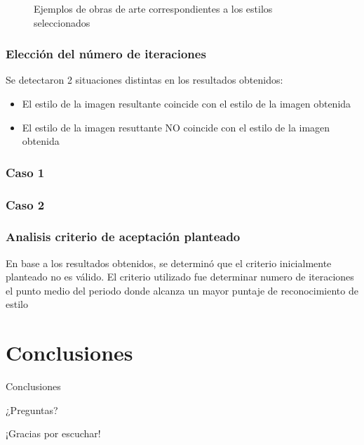 \documentclass[12pt,center]{beamer}
\begin{document}
\begin{frame}
\begin{figure}
\begin{center}
\begin{tabularx}{\textwidth}{@{}cXX@{}}
      \end{tabularx}

      \caption{Ejemplos de obras de arte correspondientes a los estilos seleccionados}\label{mosaico_estilos}
      \end{center}

    \end{figure}
\end{frame}

\begin{frame}
  \frametitle{Elección del número de iteraciones}
  Se detectaron 2 situaciones distintas en los resultados obtenidos:
  \begin{itemize}
    \item El estilo de la imagen resultante coincide con el estilo de la imagen obtenida
    \item El estilo de la imagen resuttante NO coincide con el estilo de la imagen obtenida
  \end{itemize}

\end{frame}

\begin{frame}
  \frametitle{Caso 1}
\end{frame}

\begin{frame}
  \frametitle{Caso 2}
\end{frame}

\begin{frame}
  \frametitle{Analisis criterio de aceptación planteado}
  En base a los resultados obtenidos, se determinó que el criterio inicialmente planteado no es válido.
  El criterio utilizado fue determinar numero de iteraciones el punto medio del periodo donde alcanza un mayor puntaje de reconocimiento de estilo
\end{frame}

\section{Conclusiones}
\begin{frame}{Conclusiones}
\end{frame}



\begin{frame}
 {\Huge ¿Preguntas?}
\end{frame}

\begin{frame}
 {\Huge ¡Gracias por escuchar!}
\end{frame}
\end{document}
